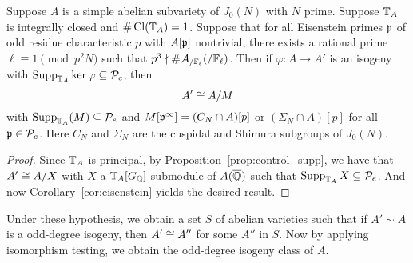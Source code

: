 \documentclass[thesis.tex]{subfiles}
\begin{document}
\begin{theorem}%
    \label{thm:combine}
    Suppose $A$ is a simple abelian subvariety of $J_0(N)$ with $N$ prime.
    Suppose $\mathbb{T}_A$ is integrally closed and $\#\operatorname{Cl}(\mathbb{T}_A)=1$. Suppose that for
    all Eisenstein primes $\mathfrak{p}$ of odd residue characteristic $p$ with $A[\mathfrak{p}]$
    nontrivial, there exists a rational prime $\ell\equiv 1\pmod{p^2N}$ such
    that $p^3\nmid \#\mathcal{A}_{/\mathbb{F}_\ell}(/\mathbb{F}_\ell)$. Then if $\varphi:A\to
    A'$ is an isogeny with $\operatorname{Supp}_{\mathbb{T}_A} \ker\varphi\subseteq \mathcal{P}_e$, then
    \[
        A'\cong A/M
    \]
    with $\operatorname{Supp}_{\mathbb{T}_A}(M)\subseteq \mathcal{P}_e$ and $M[\mathfrak{p}^\infty]=(C_N\cap A)[p]$ or
    $(\Sigma_N\cap A)[p]$ for all $\mathfrak{p}\in \mathcal{P}_e$. Here $C_N$ and $\Sigma_N$ are
    the cuspidal and Shimura subgroups of $J_0(N)$.
\end{theorem}
\begin{proof}
    Since $\mathbb{T}_A$ is principal, by Proposition~\ref{prop:control_supp}, we have
    that $A'\cong A/X$ with $X$ a $\mathbb{T}_A[G_{\mathbb{Q}}]$-submodule of $A(\overline{\mathbb{Q}})$ such
    that $\operatorname{Supp}_{\mathbb{T}_A}X\subseteq \mathcal{P}_e$. And now Corollary~\ref{cor:eisenstein}
    yields the desired result.
\end{proof}

Under these hypothesis, we obtain a set $S$ of abelian varieties such that if
$A'\sim A$ is a odd-degree isogeny, then $A'\cong A''$ for some $A''$ in $S$.
Now by applying isomorphism testing, we obtain the odd-degree isogeny class of
$A$. 



\end{document}
